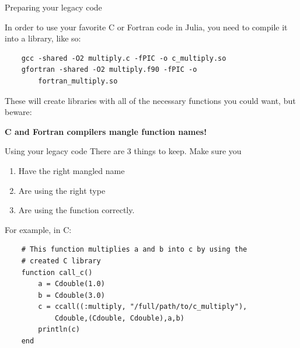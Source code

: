 \documentclass{beamer}
\begin{document}
\begin{frame}[fragile]{Preparing your legacy code}

In order to use your favorite C or Fortran code in Julia, you need to compile it into a library, like so:

\begin{Verbatim}
    gcc -shared -O2 multiply.c -fPIC -o c_multiply.so
    gfortran -shared -O2 multiply.f90 -fPIC -o 
        fortran_multiply.so
\end{Verbatim}

\pause
These will create libraries with all of the necessary functions you could want, but beware:

\begin{center}
\textbf{C and Fortran compilers mangle function names!}
\end{center}
\end{frame}

\begin{frame}[fragile]{Using your legacy code}
There are 3 things to keep. Make sure you 
\begin{enumerate}
\item Have the right mangled name
\item Are using the right type
\item Are using the function correctly.
\end{enumerate}
\pause

\vspace{0.5cm}
For example, in C:
\begin{Verbatim}
    # This function multiplies a and b into c by using the 
    # created C library
    function call_c()
        a = Cdouble(1.0)
        b = Cdouble(3.0)
        c = ccall((:multiply, "/full/path/to/c_multiply"),
            Cdouble,(Cdouble, Cdouble),a,b)
        println(c)
    end
\end{Verbatim}
\end{frame}
\end{document}
